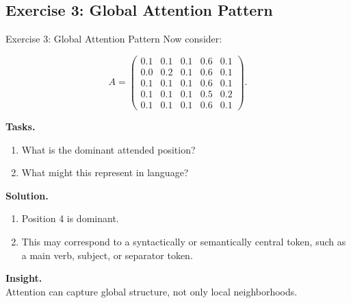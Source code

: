 \documentclass[aspectratio=169,11pt]{beamer}
\begin{document}
\subsection{Exercise 3: Global Attention Pattern}
\begin{frame}[t,allowframebreaks]{Exercise 3: Global Attention Pattern}
\small
Now consider:

\[
A =
\begin{pmatrix}
0.1 & 0.1 & 0.1 & 0.6 & 0.1 \\
0.0 & 0.2 & 0.1 & 0.6 & 0.1 \\
0.1 & 0.1 & 0.1 & 0.6 & 0.1 \\
0.1 & 0.1 & 0.1 & 0.5 & 0.2 \\
0.1 & 0.1 & 0.1 & 0.6 & 0.1
\end{pmatrix}.
\]

\textbf{Tasks.}\\ \begin{enumerate}
    \item What is the dominant attended position?
    \item What might this represent in language?
\end{enumerate}

\textbf{Solution.}\\ \begin{enumerate}
    \item Position 4 is dominant.

    \item This may correspond to a syntactically or semantically central token, such as a main verb, subject, or separator token.
\end{enumerate}

\textbf{Insight.}\\ Attention can capture global structure, not only local neighborhoods.
\end{frame}
\end{document}
